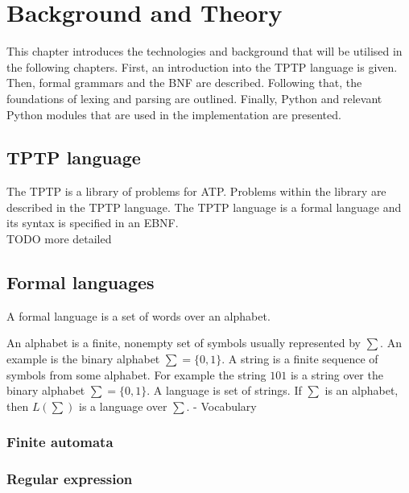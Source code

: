 
\chapter{Background and Theory}\label{cha:Background}
This chapter introduces the technologies and background that will be utilised in the following chapters. First, an introduction into the \ac{TPTP} language is given. Then, formal grammars and the \ac{BNF} are described. Following that, the foundations of lexing and parsing are outlined. Finally, Python and relevant Python modules that are used in the implementation are presented.

\section{TPTP language}\label{sec:BackgroundTPTP}
The \acf{TPTP} is a library of problems for \ac{ATP}.
Problems within the library are described in the \ac{TPTP} language.
The  \ac{TPTP} language is a formal language and its syntax is specified in an \ac{EBNF}. \cite{Sut17}\\

TODO more detailed

\section{Formal languages}\label{sec:BackgroundFormalLanguage}

A formal language is a set of words over an alphabet.

An alphabet is a finite, nonempty set of symbols usually represented by $\sum$. An example is the binary alphabet $\sum = \{0,1\}$.
A string is a finite sequence of symbols from some alphabet. For example the string $101$ is a string over the binary alphabet $\sum = \{0,1\}$.
A language is set of strings. If $\sum$ is an alphabet, then    $L(\sum)$ is a language over $\sum$. \cite{AutomataTheory.2007}
- Vocabulary


\subsection{Finite automata}\label{sec:BackgroundAutomata}

\subsection{Regular expression}\label{sec:BackgroundRegEx}

